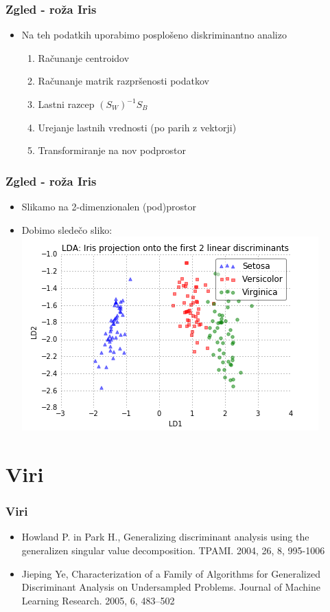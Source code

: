 \documentclass{beamer}
\begin{document}
\begin{frame}
\frametitle{Zgled - roža Iris}
\begin{itemize}
\item Na teh podatkih uporabimo posplošeno diskriminantno analizo
\begin{enumerate}
\item Računanje centroidov
\item Računanje matrik razpršenosti podatkov
\item Lastni razcep $(S_W)^{-1}S_B$
\item Urejanje lastnih vrednosti (po parih z vektorji)
\item Transformiranje na nov podprostor
\end{enumerate}
\end{itemize}
\end{frame}

\begin{frame}
\frametitle{Zgled - roža Iris}
\begin{itemize}
\item Slikamo na 2-dimenzionalen (pod)prostor
\item Dobimo sledečo sliko:
\includegraphics[scale = 0.65]{Iris3}
\end{itemize}
\end{frame}


\section{Viri}

\begin{frame}
\frametitle{Viri}
\begin{itemize}
\item Howland P. in Park H., Generalizing discriminant analysis using the generalizen singular value decomposition. TPAMI. 2004, 26, 8, 995-1006
\item Jieping Ye, Characterization of a Family of Algorithms for Generalized Discriminant Analysis on Undersampled Problems. Journal of Machine Learning Research. 2005, 6, 483–502
\end{itemize}
\end{frame}
\end{document}
